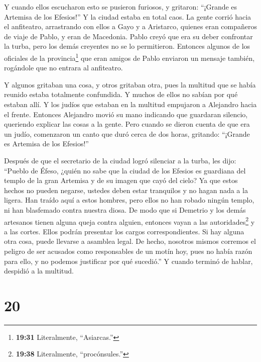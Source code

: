  Y cuando ellos escucharon esto se pusieron furiosos, y
gritaron: ``¡Grande es Artemisa de los Efesios!''  Y la
ciudad estaba en total caos. La gente corrió hacia el anfiteatro,
arrastrando con ellos a Gayo y a Aristarco, quienes eran compañeros de
viaje de Pablo, y eran de Macedonia.  Pablo creyó que era
su deber confrontar la turba, pero los demás creyentes no se lo
permitieron.  Entonces algunos de los oficiales de la
provincia\footnote{\textbf{19:31} Literalmente, ``Asiarcas.''} que eran
amigos de Pablo enviaron un mensaje también, rogándole que no entrara al
anfiteatro.

 Y algunos gritaban una cosa, y otros gritaban otra, pues
la multitud que se había reunido estaba totalmente confundida. Y muchos
de ellos no sabían por qué estaban allí.  Y los judíos que
estaban en la multitud empujaron a Alejandro hacia el frente. Entonces
Alejandro movió su mano indicando que guardaran silencio, queriendo
explicar las cosas a la gente.  Pero cuando se dieron
cuenta de que era un judío, comenzaron un canto que duró cerca de dos
horas, gritando: ``¡Grande es Artemisa de los Efesios!''

 Después de que el secretario de la ciudad logró silenciar
a la turba, les dijo: ``Pueblo de Éfeso, ¿quién no sabe que la ciudad de
los Efesios es guardiana del templo de la gran Artemisa y de su imagen
que cayó del cielo?  Ya que estos hechos no pueden negarse,
ustedes deben estar tranquilos y no hagan nada a la ligera.
 Han traído aquí a estos hombres, pero ellos no han robado
ningún templo, ni han blasfemado contra nuestra diosa.  De
modo que si Demetrio y los demás artesanos tienen alguna queja contra
alguien, entonces vayan a las autoridades\footnote{\textbf{19:38}
  Literalmente, ``procónsules.''} y a las cortes. Ellos podrán presentar
los cargos correspondientes.  Si hay alguna otra cosa,
puede llevarse a asamblea legal.  De hecho, nosotros mismos
corremos el peligro de ser acusados como responsables de un motín hoy,
pues no había razón para ello, y no podemos justificar por qué
sucedió.''  Y cuando terminó de hablar, despidió a la
multitud.

\hypertarget{section-19}{%
\section{20}\label{section-19}}

